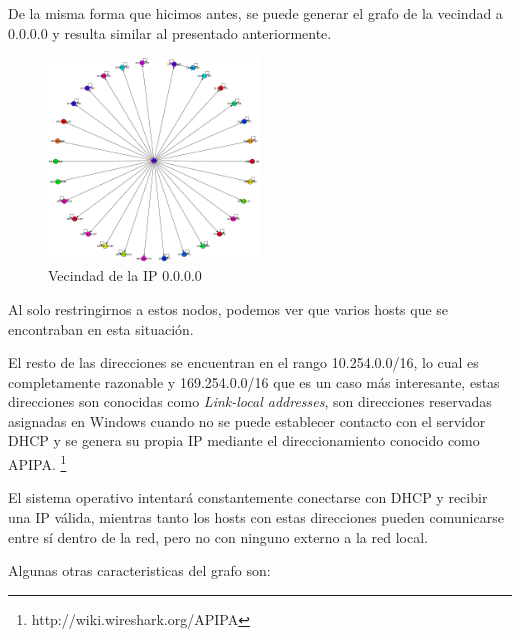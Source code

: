     \par De la misma forma que hicimos antes, se puede generar el grafo de la vecindad a 0.0.0.0 y resulta similar al presentado anteriormente.
    
\begin{figure}[H]
		\centering
		\includegraphics[width=0.5\textwidth]{img/graph/escenario_3/0000_aislado.eps}
		\caption{Vecindad de la IP 0.0.0.0}
		\label{fig:0_escenario3}
\end{figure}

	\par Al solo restringirnos a estos nodos, podemos ver que varios hosts que se encontraban en esta situación.
\vspace{6 mm}

	\par El resto de las direcciones se encuentran en el rango 10.254.0.0/16, lo cual es completamente razonable y 169.254.0.0/16 que es un caso más interesante, estas direcciones son conocidas como \emph{Link-local addresses}, son direcciones reservadas asignadas en Windows cuando no se puede establecer contacto con el servidor DHCP y se genera su propia IP mediante el direccionamiento conocido como APIPA. \footnote{http://wiki.wireshark.org/APIPA}

	\par El sistema operativo intentará constantemente conectarse con DHCP y recibir una IP válida, mientras tanto los hosts con estas direcciones pueden comunicarse entre sí dentro de la red, pero no con ninguno externo a la red local.
\vspace{6 mm}
	\par Algunas otras caracteristicas del grafo son:


